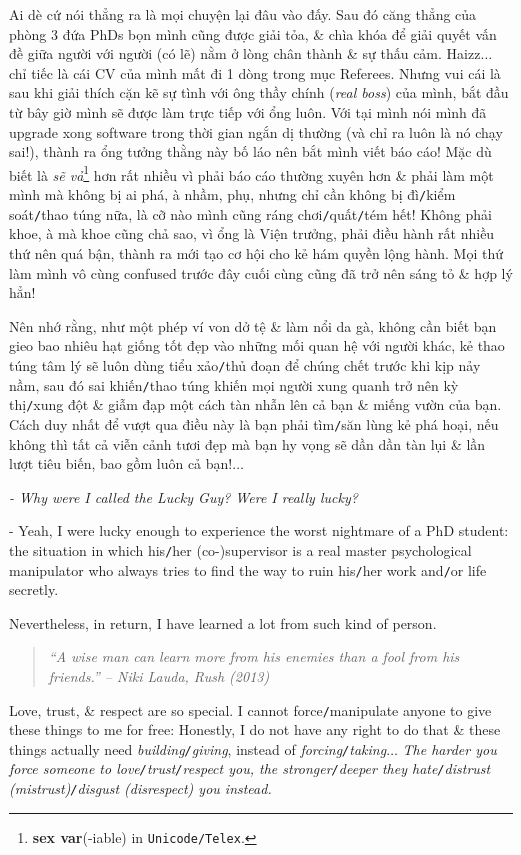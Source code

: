 \documentclass[12pt]{article}
\begin{document}
Ai dè cứ nói thẳng ra là mọi chuyện lại đâu vào đấy. Sau đó căng thẳng của phòng 3 đứa PhDs bọn mình cũng được giải tỏa, \& chìa khóa để giải quyết vấn đề giữa người với người (có lẽ) nằm ở lòng chân thành \& sự thấu cảm. Haizz$\ldots$ chỉ tiếc là cái CV của mình mất đi 1 dòng trong mục Referees. Nhưng vui cái là sau khi giải thích cặn kẽ sự tình với ông thầy chính ({\it real boss}) của mình, bắt đầu từ bây giờ mình sẽ được làm trực tiếp với ổng luôn. Với tại mình nói mình đã upgrade xong software trong thời gian ngắn dị thường (và chỉ ra luôn là nó chạy sai!), thành ra ổng tưởng thằng này bố láo nên bắt mình viết báo cáo! Mặc dù biết là {\it sẽ vả}\footnote{\textbf{sex var}(-iable) in {\tt Unicode/Telex}.} hơn rất nhiều vì phải báo cáo thường xuyên hơn \& phải làm một mình mà không bị ai phá, à nhầm, phụ, nhưng chỉ cần không bị đì{\tt/}kiểm soát{\tt/}thao túng nữa, là cỡ nào mình cũng ráng chơi{\tt/}quất{\tt/}tém hết! Không phải khoe, à mà khoe cũng chả sao, vì ổng là Viện trưởng, phải điều hành rất nhiều thứ nên quá bận, thành ra mới tạo cơ hội cho kẻ hám quyền lộng hành. Mọi thứ làm mình vô cùng confused trước đây cuối cùng cũng đã trở nên sáng tỏ \& hợp lý hẳn!

Nên nhớ rằng, như một phép ví von dở tệ \& làm nổi da gà, không cần biết bạn gieo bao nhiêu hạt giống tốt đẹp vào những mối quan hệ với người khác, kẻ thao túng tâm lý sẽ luôn dùng tiểu xảo{\tt/}thủ đoạn để chúng chết trước khi kịp nảy nầm, sau đó sai khiến{\tt/}thao túng khiến mọi người xung quanh trở nên kỳ thị{\tt/}xung đột \& giẫm đạp một cách tàn nhẫn lên cả bạn \& miếng vườn của bạn. Cách duy nhất để vượt qua điều này là bạn phải tìm{\tt/}săn lùng kẻ phá hoại, nếu không thì tất cả viễn cảnh tươi đẹp mà bạn hy vọng sẽ dần dần tàn lụi \& lần lượt tiêu biến, bao gồm luôn cả bạn!$\ldots$

{\it - Why were I called the Lucky Guy? Were I really lucky?}

- Yeah, I were lucky enough to experience the worst nightmare of a PhD student: the situation in which his{\tt/}her (co-)supervisor is a real master psychological manipulator who always tries to find the way to ruin his{\tt/}her work and{\tt/}or life secretly.

Nevertheless, in return, I have learned a lot from such kind of person.

\begin{quote}\it
	``A wise man can learn more from his enemies than a fool from his friends.'' -- {\sc Niki Lauda}, Rush (2013)
\end{quote}
Love, trust, \& respect are so special. I cannot force{\tt/}manipulate anyone to give these things to me for free: Honestly, I do not have any right to do that \& these things actually need {\it building{\tt/}giving}, instead of {\it forcing{\tt/}taking}$\ldots$ {\it The harder you force someone to love{\tt/}trust{\tt/}respect you, the stronger{\tt/}deeper they hate{\tt/}distrust (mistrust){\tt/}disgust (disrespect) you instead.}
\end{document}
